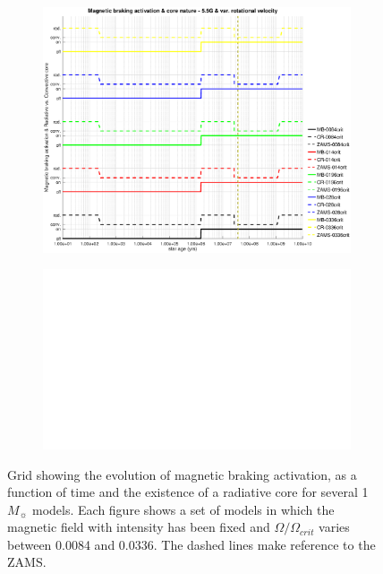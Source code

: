 \documentclass[fleqn,usenatbib]{mnras}
\begin{document}
\begin{figure}
\begin{subfigure}[h]{0.47\textwidth}
    \includegraphics[trim = 30mm 15mm 20mm 15mm, clip,width=\textwidth]{figures/mb_act_var_vel_5_5g.eps}
    \label{fig:subim35}
    \end{subfigure}
    \begin{subfigure}[h]{0.47\textwidth}
    \includegraphics[width=\textwidth]{figures/blank.eps}
    \label{fig:subim36}
    \end{subfigure}
\caption{Grid showing the evolution of magnetic braking activation, as a function of time and the existence of a radiative core for several 1 $M_{\sun}$ models. Each figure shows a set of models in which the magnetic field with intensity has been fixed and $\Omega / \Omega_{crit}$ varies between 0.0084 and 0.0336. The dashed lines make reference to the ZAMS.}
\label{fig:grid_mb_act}
\end{figure}
\end{document}
